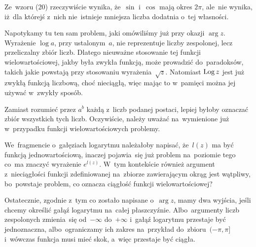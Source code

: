 \documentclass[a4paper,11pt]{article}
\numberwithin{equation}{section}
\begin{document}
\VerSpaceFour





\noindent
{} Ze~wzoru (20) rzeczywiście wynika, że~$\sin$ i~$\cos$
mają okres $2 \pi$, ale~nie wynika, iż~dla którejś z~nich nie~istnieje
mniejsza liczba dodatnia o~tej własności.

\VerSpaceFour





\noindent
{} Napotykamy tu ten sam problem, jaki omówiliśmy już przy okazji
$\arg z$. Wyrażenie $\log a$, przy ustalonym~$a$, nie reprezentuje liczby
zespolonej, lecz przeliczalny zbiór liczb. Dlatego nieuważne stosowanie tej
funkcji wielowartościowej, jakby była zwykła funkcją, może prowadzić
do~paradoksów, takich jakie powstają przy stosowaniu
wyrażenia~$\sqrt{ z }$. Natomiast $\operatorname{Log} z$ jest już zwykłą funkcją
liczbową, choć nieciągłą, więc mając to w~pamięci można jej używać w~zwykły
sposób.

\VerSpaceFour





\noindent
{} Zamiast rozumieć przez $a^{ b }$ każdą z~liczb podanej postaci,
lepiej byłoby oznaczać zbiór wszystkich tych liczb. Oczywiście, należy
uważać na~wymienione już w~przypadku funkcji wielowartościowych problemy.

\VerSpaceFour





\noindent
{} We~fragmencie o~gałęziach logarytmu należałoby napisać,
że~$l( z )$ ma być funkcją jednowartościową, inaczej pojawia~się już
problem na~poziomie tego co~ma znaczyć wyrażenie $e^{ l( z ) }$. W~tym
kontekście również argument z~nieciągłości funkcji zdefiniowanej na~zbiorze
zawierającym okrąg jest wątpliwy, bo~powstaje problem, co oznacza ciągłość
funkcji wielowartościowej?

Ostatecznie, zgodnie z~tym co zostało napisane o~$\arg z$, mamy dwa
wyjścia, jeśli chcemy określić gałąź logarytmu na~całej płaszczyźnie.
Albo~argumenty liczb zespolonych zmienia~się od~$-\infty$ do~$+\infty$
i~gałąź logarytmu przestaje być jednoznaczna, albo~ograniczamy ich
zakres na~przykład do~zbioru~$( -\pi, \pi ]$ i~wówczas funkcja musi
mieć skok, a~więc przestaje być ciągła.

\VerSpaceFour
\end{document}
